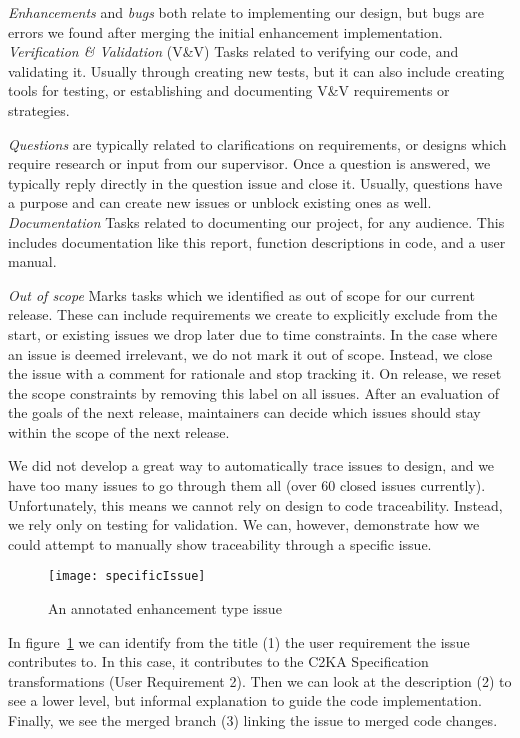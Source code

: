     \textit{Enhancements} and \textit{bugs} both relate to implementing our design,
    but bugs are errors we found after merging the initial enhancement implementation.
    \textit{Verification \& Validation} (V\&V) Tasks related to verifying our code, and validating it.
    Usually through creating new tests, but it can also include creating tools for testing,
    or establishing and documenting V\&V requirements or strategies.

    \textit{Questions} are typically related to clarifications on requirements,
    or designs which require research or input from our supervisor.
    Once a question is answered, we typically reply directly in the question issue and close it.
    Usually, questions have a purpose and can create new issues or unblock existing ones as well.
    \textit{Documentation} Tasks related to documenting our project, for any audience.
    This includes documentation like this report, function descriptions in code, and a user manual.

    \textit{Out of scope} Marks tasks which we identified as out of scope for our current release.
    These can include requirements we create to explicitly exclude from the start,
    or existing issues we drop later due to time constraints.
    In the case where an issue is deemed irrelevant, we do not mark it out of scope.
    Instead, we close the issue with a comment for rationale and stop tracking it.
    On release, we reset the scope constraints by removing this label on all issues.
    After an evaluation of the goals of the next release,
    maintainers can decide which issues should stay within the scope of the next release.

    We did not develop a great way to automatically trace issues to design,
    and we have too many issues to go through them all (over 60 closed issues currently).
    Unfortunately, this means we cannot rely on design to code traceability.
    Instead, we rely only on testing for validation.
    We can, however, demonstrate how we could attempt to manually show traceability through a specific issue.
    \begin{figure}[h]
        \centering
        \texttt{[image: specificIssue]}
        \caption{An annotated enhancement type issue}
        \label{fig:specificIssue}
    \end{figure}
    In figure~\ref{fig:specificIssue} we can identify from the title (1) the user requirement the issue contributes to.
    In this case, it contributes to the C2KA Specification transformations (User Requirement 2).
    Then we can look at the description (2) to see a lower level, but informal explanation to guide the code implementation.
    Finally, we see the merged branch (3) linking the issue to merged code changes.

